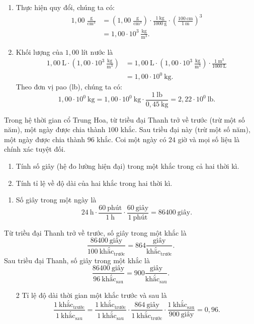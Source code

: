 \documentclass[a4paper, titlepage, openany]{book}
\newcounter{exercise}
\newcounter{solution}
\begin{document}
\solution
\begin{enumerate}
   \item Thực hiện quy đổi, chúng ta có:
   \begin{align*}
      1{,}00\;\frac{\text{g}}{\text{cm}^3} &= \left(1{,}00\;\frac{\text{g}}{\text{cm}^3}\right)\cdot\frac{1\ \text{kg}}{1000\ \text{g}}\cdot\left(\frac{100\ \text{cm}}{1\ \text{m}}\right)^3 \\
      &= \boxed{1{,}00\cdot 10^3\ \frac{\text{kg}}{\text{m}^3}}.
   \end{align*}
   \item Khối lượng của $1{,}00$ lít nước là
   \begin{align*}
      1{,}00\ \text{L} \cdot \left(1{,}00\cdot 10^3\ \frac{\text{kg}}{\text{m}^3}\right)&= 1{,}00\ \text{L} \cdot \left(1{,}00\cdot 10^3\ \frac{\text{kg}}{\text{m}^3}\right) \cdot \frac{1\ \text{m}^3}{1000\ \text{L}} \\
      &= \boxed{1{,}00\cdot 10^0\ \text{kg}}.
   \end{align*}
   Theo đơn vị pao (lb), chúng ta có:
   \[
      1{,}00\cdot 10^0\ \text{kg} = 1{,}00\cdot 10^0\ \text{kg} \cdot \frac{1\ \text{lb}}{0{,}45\ \text{kg}} = \boxed{2{,}22\cdot 10^0\ \text{lb}}.
   \]
\end{enumerate}

\exercise Trong hệ thời gian cổ Trung Hoa, từ triều đại Thanh trở về trước (trừ một số năm), một ngày được chia thành $100$ khắc. Sau triều đại này (trừ một số năm), một ngày được chia thành $96$ khắc. Coi một ngày có $24$ giờ và mọi số liệu là chính xác tuyệt đối.
\begin{enumerate}
   \item Tính số giây (hệ đo lường hiện đại) trong một khắc trong cả hai thời kì.
   \item Tính tỉ lệ về độ dài của hai khắc trong hai thời kì.
\end{enumerate}

\solution
\begin{enumerate}
   \item Số giây trong một ngày là $$24\ \text{h} \cdot \frac{60\ \text{phút}}{1\ \text{h}} \cdot \frac{60\ \text{giây}}{1\ \text{phút}} = 86400\ \text{giây}.$$
\end{enumerate}
Từ triều đại Thanh trở về trước, số giây trong một khắc là $$\frac{86400\ \text{giây}}{100\ \text{khắc}_{\text{trước}}} = \boxed{864 \frac{\text{giây}}{\text{khắc}_{\text{trước}}}}.$$
Sau triều đại Thanh, số giây trong một khắc là $$\frac{86400\ \text{giây}}{96\ \text{khắc}_{\text{sau}}} = \boxed{900 \frac{\text{giây}}{\text{khắc}_{\text{sau}}}}.$$
\begin{enumerate}
   \item[2] Tỉ lệ độ dài thời gian một khắc trước và sau là $$\frac{1\ \text{khắc}_{\text{trước}}}{1\ \text{khắc}_{\text{sau}}} = \frac{1\ \text{khắc}_{\text{trước}}}{1\ \text{khắc}_{\text{sau}}}\cdot \frac{864\ \text{giây}}{1\ \text{khắc}_{\text{trước}}}\cdot\frac{1\ \text{khắc}_{\text{sau}}}{900\ \text{giây}}=\boxed{0{,}96}.$$
\end{enumerate}
\end{document}
